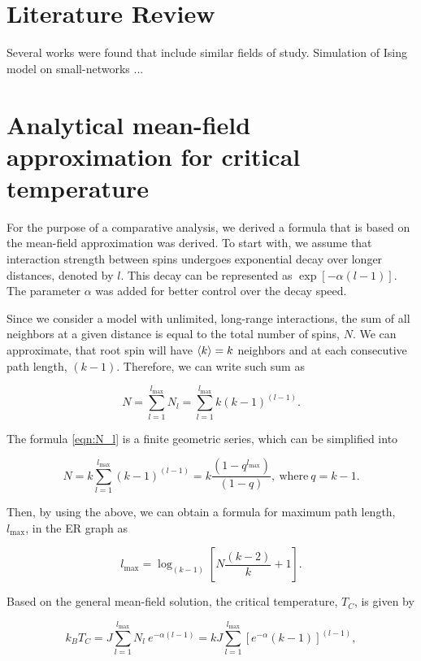 \documentclass[11pt,a4paper]{article}
\begin{document}
\section{Literature Review}

Several works were found that include similar fields of study. 
Simulation of Ising model on small-networks ...

\section{Analytical mean-field approximation for critical temperature}

For the purpose of a comparative analysis, we derived a formula that is based on the mean-field approximation was derived. To start with, we assume that interaction strength between spins undergoes exponential decay over longer distances, denoted by $l$. This decay can be represented as $\exp[-\alpha (l-1)]$. The parameter $\alpha$ was added for better control over the decay speed.

Since we consider a model with unlimited, long-range interactions, the sum of all neighbors at a given distance is equal to the total number of spins, $N$. We can approximate, that root spin will have $\braket{k}=k$ neighbors and at each consecutive path length, $(k-1)$. Therefore, we can write such sum as

\begin{equation}\label{eqn:N_l}
    N = \sum_{l=1}^{l_{\max}} N_l = \sum_{l=1}^{l_{\max}} k (k-1)^{(l-1)}.
\end{equation}

The formula \eqref{eqn:N_l} is a finite geometric series, which can be simplified into

\begin{equation}\label{eqn:geom_series}
    N = k \sum_{l=1}^{l_{\max}} (k-1)^{(l-1)} = k\frac{(1 - q^{l_{\max}})}{(1 - q)},\ \text{where}\ q=k-1.
\end{equation}

Then, by using the above, we can obtain a formula for maximum path length, $l_{\max}$, in the ER graph as

\begin{equation}\label{eqn:l_max}
    l_{\max} = \log_{(k-1)}{\left[N\frac{(k-2)}{k} + 1\right]}.
\end{equation}

Based on the general mean-field solution, the critical temperature, $T_C$, is given by

\begin{equation}\label{eqn:base_tc}
    k_B T_C = J \sum_{l=1}^{l_{\max}} N_l~ e^{-\alpha (l-1)} = kJ \sum_{l=1}^{l_{\max}} \left[e^{-\alpha}(k-1)\right]^{(l-1)},
\end{equation}
\end{document}
